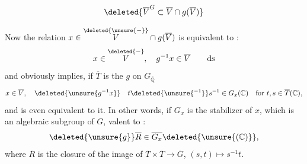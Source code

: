 \[
\deleted{\overline V^{G}\subset\overline V\cap g(\overline V)}
\]

Now the relation $x\in\overset{\deleted{\unsure{-}}}{V}\cap g(\overline V)$ is equivalent to :
\begingroup\makeatletter\tagsleft@true\makeatother
\[
x\in\overset{\deleted{-}}{V},\quad g^{-1}x\in\overline V \tag*{ds}
\]
\endgroup
and obviously implies, if $\overline T$ is the   $g$ on $G_{\overline{\mathbb Q}}$
\[
x\in\overline V,\quad\deleted{\unsure{g^{-1}x}}\quad t\deleted{\unsure{^{-1}}}s^{-1}\in G_x(\mathbb C)\quad\text{for }t,s\in\overline T(\mathbb C),
\]
and is even equivalent to it.
In other words, if $G_x$ is the stabilizer of $x$, which is an algebraic subgroup of $G$,  valent to :
\[
\deleted{\unsure{g}}\overline R\in\overline{G_x}\deleted{\unsure{(\mathbb C)}},
\]
where $\overline R$ is the closure of the image of $\overline T\times\overline T\longrightarrow\overline G$, $(s,t)\longmapsto s^{-1}t$.

